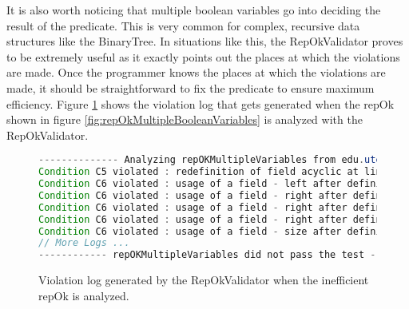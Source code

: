 \para
It is also worth noticing that multiple boolean variables go into deciding the result of the predicate. This is very common for complex, recursive data structures like the BinaryTree. In situations like this, the RepOkValidator proves to be extremely useful as it exactly points out the places at which the violations are made. Once the programmer knows the places at which the violations are made, it should be straightforward to fix the predicate to ensure maximum efficiency. Figure \ref{fig:repOkKoratSatisfyEfficiencyLog} shows the violation log that gets generated when the repOk shown in figure \ref{fig:repOkMultipleBooleanVariables} is analyzed with the RepOkValidator.

\begin{figure}
\centering
\begin{lstlisting}[language=Java]
-------------- Analyzing repOKMultipleVariables from edu.utexas.BinaryTree ------------
Condition C5 violated : redefinition of field acyclic at line 91 inside repOKMultipleVariables in edu.utexas.BinaryTree.java
Condition C6 violated : usage of a field - left after defining return value from class edu.utexas.BinaryTree$Node at line 87 inside repOKMultipleVariables in edu.utexas.BinaryTree.java
Condition C6 violated : usage of a field - right after defining return value from class edu.utexas.BinaryTree$Node at line 89 inside repOKMultipleVariables in edu.utexas.BinaryTree.java
Condition C6 violated : usage of a field - right after defining return value from class edu.utexas.BinaryTree$Node at line 90 inside repOKMultipleVariables in edu.utexas.BinaryTree.java
Condition C6 violated : usage of a field - right after defining return value from class edu.utexas.BinaryTree$Node at line 92 inside repOKMultipleVariables in edu.utexas.BinaryTree.java
Condition C6 violated : usage of a field - size after defining return value from class edu.utexas.BinaryTree at line 96 inside repOKMultipleVariables in edu.utexas.BinaryTree.java
// More Logs ...
------------ repOKMultipleVariables did not pass the test ------------
\end{lstlisting}
\caption{Violation log generated by the RepOkValidator when the inefficient repOk is analyzed.}
\label{fig:repOkKoratSatisfyEfficiencyLog}
\end{figure}
